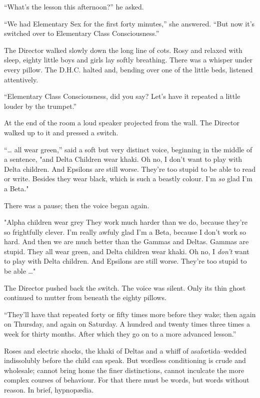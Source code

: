 \documentclass[12pt]{report}
\begin{document}
``What's the lesson this afternoon?'' he asked.

``We had Elementary Sex for the first forty minutes,'' she answered.
``But now it's switched over to Elementary Class Consciousness.''

The Director walked slowly down the long line of cots. Rosy and relaxed
with sleep, eighty little boys and girls lay softly breathing. There was
a whisper under every pillow. The D.H.C. halted and, bending over one of
the little beds, listened attentively.

``Elementary Class Consciousness, did you say? Let's have it repeated a
little louder by the trumpet.''

At the end of the room a loud speaker projected from the wall. The
Director walked up to it and pressed a switch.

``\ldots{} all wear green,'' said a soft but very distinct voice,
beginning in the middle of a sentence, "and Delta Children wear khaki.
Oh no, I don't want to play with Delta children. And Epsilons are still
worse. They're too stupid to be able to read or write. Besides they wear
black, which is such a beastly colour. I'm \emph{so} glad I'm a Beta."

There was a pause; then the voice began again.

"Alpha children wear grey They work much harder than we do, because
they're so frightfully clever. I'm really awfuly glad I'm a Beta,
because I don't work so hard. And then we are much better than the
Gammas and Deltas. Gammas are stupid. They all wear green, and Delta
children wear khaki. Oh no, I \emph{don't} want to play with Delta
children. And Epsilons are still worse. They're too stupid to be able
\ldots{}"

The Director pushed back the switch. The voice was silent. Only its thin
ghost continued to mutter from beneath the eighty pillows.

``They'll have that repeated forty or fifty times more before they wake;
then again on Thursday, and again on Saturday. A hundred and twenty
times three times a week for thirty months. After which they go on to a
more advanced lesson.''

Roses and electric shocks, the khaki of Deltas and a whiff of
asafœtida--wedded indissolubly before the child can speak. But wordless
conditioning is crude and wholesale; cannot bring home the finer
distinctions, cannot inculcate the more complex courses of behaviour.
For that there must be words, but words without reason. In brief,
hypnopædia.
\end{document}
